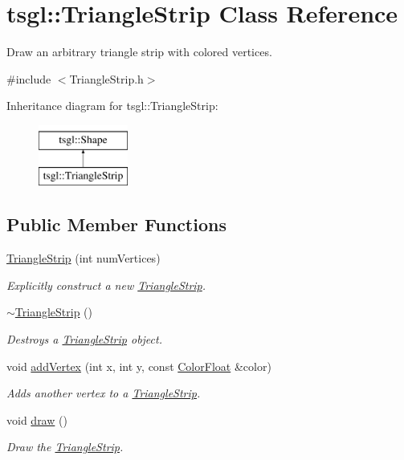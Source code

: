 \hypertarget{classtsgl_1_1_triangle_strip}{}\section{tsgl\+:\+:Triangle\+Strip Class Reference}
\label{classtsgl_1_1_triangle_strip}


Draw an arbitrary triangle strip with colored vertices.  




{\ttfamily \#include $<$Triangle\+Strip.\+h$>$}

Inheritance diagram for tsgl\+:\+:Triangle\+Strip\+:\begin{figure}[H]
\begin{center}
\leavevmode
\includegraphics[height=2.000000cm]{classtsgl_1_1_triangle_strip}
\end{center}
\end{figure}
\subsection*{Public Member Functions}
\begin{DoxyCompactItemize}
\item 
\hyperlink{classtsgl_1_1_triangle_strip_ad68084f6e384f9faf86f2de673de0502}{Triangle\+Strip} (int num\+Vertices)
\begin{DoxyCompactList}\small\item\em Explicitly construct a new \hyperlink{classtsgl_1_1_triangle_strip}{Triangle\+Strip}. \end{DoxyCompactList}\item 
\hyperlink{classtsgl_1_1_triangle_strip_aab2dc311f7c7df4712c901878c048d96}{$\sim$\+Triangle\+Strip} ()
\begin{DoxyCompactList}\small\item\em Destroys a \hyperlink{classtsgl_1_1_triangle_strip}{Triangle\+Strip} object. \end{DoxyCompactList}\item 
void \hyperlink{classtsgl_1_1_triangle_strip_ad1773092235f2477bae32f10387874ef}{add\+Vertex} (int x, int y, const \hyperlink{structtsgl_1_1_color_float}{Color\+Float} \&color)
\begin{DoxyCompactList}\small\item\em Adds another vertex to a \hyperlink{classtsgl_1_1_triangle_strip}{Triangle\+Strip}. \end{DoxyCompactList}\item 
void \hyperlink{classtsgl_1_1_triangle_strip_a7a984063f85c8b6ab61bd6e989d38920}{draw} ()
\begin{DoxyCompactList}\small\item\em Draw the \hyperlink{classtsgl_1_1_triangle_strip}{Triangle\+Strip}. \end{DoxyCompactList}\end{DoxyCompactItemize}
